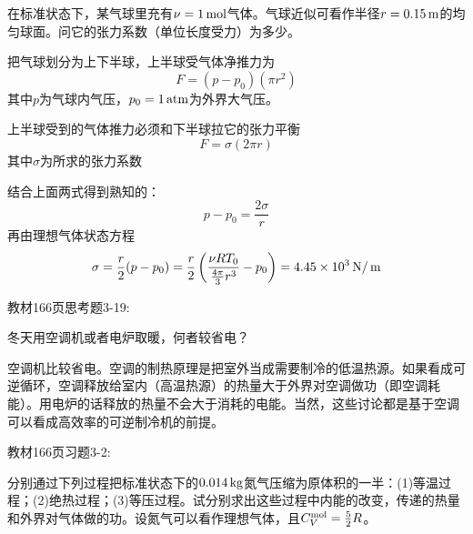 \documentclass[CJK]{beamer}
\begin{document}
\begin{frame}
  \chtitle{\proid (\stwo)}
  \bch
  在标准状态下，某气球里充有$\nu=1\,\mathrm{mol}$气体。气球近似可看作半径$r=0.15\,\mathrm{m}$的均匀球面。问它的张力系数（单位长度受力）为多少。

  
  \ech
\end{frame}

\begin{frame}
  \bch
  {\small
  把气球划分为上下半球，上半球受气体净推力为
  $$F=(p -p_0)(\pi r^2)$$
  其中$p$为气球内气压，$p_0=1\,\mathrm{atm}$为外界大气压。

  上半球受到的气体推力必须和下半球拉它的张力平衡
  $$ F = \sigma (2\pi r)$$
  其中$\sigma$为所求的张力系数

  结合上面两式得到熟知的：
  $$ p-p_0 = \frac{2\sigma}{r} $$
  再由理想气体状态方程
  $$\sigma = \frac{r}{2}(p-p_0) = \frac{r}{2}\left(\frac{\nu R T_0}{\frac{4\pi}{3}r^3} - p_0\right) = 4.45\times 10^3 \,\mathrm{N}/\,\mathrm{m} $$

  }
  \ech
\end{frame}

\begin{frame}
  \chtitle{\proid  (\sthree)}
  \bch

  教材166页思考题3-19:
  
  冬天用空调机或者电炉取暖，何者较省电？


  \ech
\end{frame}


\begin{frame}
  \bch
  空调机比较省电。空调的制热原理是把室外当成需要制冷的低温热源。如果看成可逆循环，空调释放给室内（高温热源）的热量大于外界对空调做功（即空调耗能）。用电炉的话释放的热量不会大于消耗的电能。当然，这些讨论都是基于空调可以看成高效率的可逆制冷机的前提。
  \ech
\end{frame}

\begin{frame}
  \chtitle{\proid   (\stwo)}
  \bch
  教材166页习题3-2:

  分别通过下列过程把标准状态下的$0.014\,\mathrm{kg}$氮气压缩为原体积的一半：(1)等温过程；(2)绝热过程；(3)等压过程。试分别求出这些过程中内能的改变，传递的热量和外界对气体做的功。设氮气可以看作理想气体，且$C_V^{\rm mol} = \frac{5}{2}R$。
  
  \ech
\end{frame}
\end{document}

